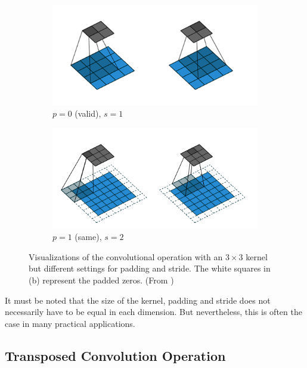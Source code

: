 \begin{figure}[htpb]
\centering
\begin{subfigure}{0.5\textwidth}
  \centering
  \includegraphics[width=.9\linewidth]{figures/conv_valid.png}
  \caption{$p=0$ (valid), $s=1$}
  \label{fig:conv_valid}
\end{subfigure}%
\begin{subfigure}{0.5\textwidth}
  \centering
  \includegraphics[width=0.9\linewidth]{figures/conv_same.png}
  \caption{$p=1$ (same), $s=2$}
  \label{fig:conv_same}
\end{subfigure}
\caption[Convolution Operation]{Visualizations of the convolutional operation with an $3 \times 3$ kernel but different settings for padding and stride. The white squares in (b) represent the padded zeros. (From \parencite{conv_guide})}
\label{fig:conv}
\end{figure}

It must be noted that the size of the kernel, padding and stride does not necessarily have to be equal in each dimension. But nevertheless, this is often the case in many practical applications.

\subsection{Transposed Convolution Operation}

